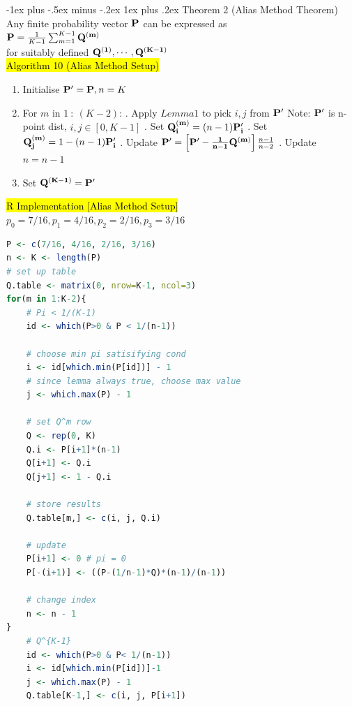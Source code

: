 \documentclass[a4paper,12pt,landscape]{article}
\makeatletter
\renewcommand{\subsubsection}{\@startsection{subsubsection}{3}{0mm}%
                                {-1ex plus -.5ex minus -.2ex}%
                                {1ex plus .2ex}%
                                {\normalfont\small\bfseries\color{violet}}}
\makeatother
\begin{document}
\begin{multicols}{3}
    \subsubsection{Theorem 2 (Alias Method Theorem)}
    Any finite probability vector $\bold{P}$ can be expressed as\\
    $\bold{P} = \frac{1}{K-1}\sum_{m=1}^{K-1}\bold{Q^{(m)}}$\\
    for suitably defined $\bold{Q^{(1)}, \cdots, \bold{Q^{(K-1)}}}$\\
    \hl{Algorithm 10 (Alias Method Setup)}\\
    \begin{enumerate}
        \item Initialise $\bold{P'}=\bold{P}, n=K$
        \item For $m$ in $1~:~(K-2)$:
            . Apply $Lemma 1$ to pick $i, j$ from $\bold{P'}$
            \subsubitem Note: $\bold{P'}$ is n-point dist, $i, j \in [0, K-1]$
            . Set $\bold{Q_i^{(m)}}=(n-1)\bold{P'_i}$
            . Set $\bold{Q_j^{(m)}}=1-(n-1)\bold{P_i'}$
            . Update
            \subsubitem
            $\bold{P'}=\left[\bold{P'-\frac{1}{n-1}\bold{Q^{(m)}}}\right]\frac{n-1}{n-2}$
            . Update $n=n-1$
        \item Set $\bold{Q^{(K-1)}}=\bold{P'}$
    \end{enumerate}
    \hl{R Implementation [Alias Method Setup]}\\
    $p_0=7/16, p_1=4/16, p_2=2/16, p_3=3/16$\\
    \begin{lstlisting}[language=R]
P <- c(7/16, 4/16, 2/16, 3/16)
n <- K <- length(P)
# set up table
Q.table <- matrix(0, nrow=K-1, ncol=3) 
for(m in 1:K-2){
    # Pi < 1/(K-1)
    id <- which(P>0 & P < 1/(n-1)) 
    
    # choose min pi satisifying cond
    i <- id[which.min(P[id])] - 1 
    # since lemma always true, choose max value
    j <- which.max(P) - 1

    # set Q^m row 
    Q <- rep(0, K)
    Q.i <- P[i+1]*(n-1)
    Q[i+1] <- Q.i
    Q[j+1] <- 1 - Q.i
    
    # store results
    Q.table[m,] <- c(i, j, Q.i)

    # update
    P[i+1] <- 0 # pi = 0
    P[-(i+1)] <- ((P-(1/n-1)*Q)*(n-1)/(n-1))

    # change index
    n <- n - 1
}
    # Q^{K-1}
    id <- which(P>0 & P< 1/(n-1))
    i <- id[which.min(P[id])]-1
    j <- which.max(P) - 1
    Q.table[K-1,] <- c(i, j, P[i+1])


\end{lstlisting}
\end{multicols}
\end{document}
